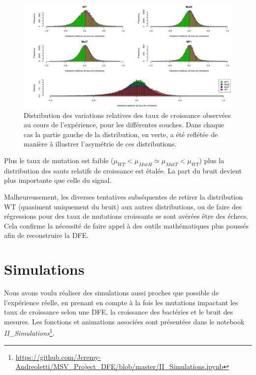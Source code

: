 \documentclass[12pt]{article}
\begin{document}
\begin{figure}[!h]
  \begin{center}
    \vspace{3mm}
    \includegraphics[scale=0.3]{../Img/Variations_relatives_GR.png}
  \end{center} 
  \caption{\label{fig:VarRel}Distribution des variations relatives des taux de croissance observées au cours de l'expérience, pour les différentes souches. Dans chaque cas la partie gauche de la distribution, en verte, a été reflétée de manière à illustrer l'asymétrie de ces distributions.}
\end{figure}

Plus le taux de mutation est faible ($\mu_{WT} < \mu_{MutH} \simeq \mu_{MutT} < \mu_{WT}$) plus la distribution des sauts relatifs de croissance est étalée. La part du bruit devient plus importante que celle du signal.

Malheureusement, les diverses tentatives subséquentes de retirer la distribution WT (quasiment uniquement du bruit) aux autres distributions, ou de faire des régressions pour des taux de mutations croissants se sont avérées être des échecs. Cela confirme la nécessité de faire appel à des outils mathématiques plus poussés afin de reconstruire la DFE.

\FloatBarrier
\section{Simulations}

Nous avons voulu réaliser des simulations aussi proches que possible de l'expérience réelle, en prenant en compte à la fois les mutations impactant les taux de croissance selon une DFE, la croissance des bactéries et le bruit des mesures. Les fonctions et animations associées sont présentées dans le notebook \emph{II\_Simulations}\footnote{\url{https://github.com/Jeremy-Andreoletti/MSV_Project_DFE/blob/master/II_Simulations.ipynb}}.
\end{document}
